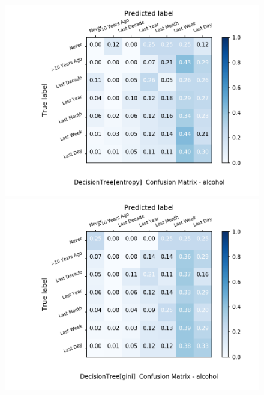 \documentclass{article}
\begin{document}
\begin{figure}[h!]
	\centering
	\begin{minipage}[b]{0.32\textwidth}
		\includegraphics[width=\textwidth]{Plots/alcohol_DecisionTree_entropy.png}
	\end{minipage}
	\begin{minipage}[b]{0.32\textwidth}
		\includegraphics[width=\textwidth]{Plots/alcohol_DecisionTree_gini.png}
	\end{minipage}
	\begin{minipage}[b]{0.32\textwidth}

\end{minipage}
\end{figure}
\end{document}
